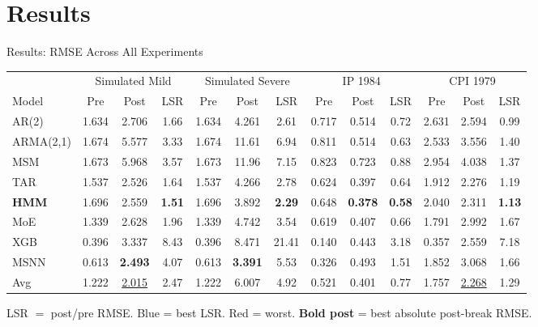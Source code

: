 \documentclass[aspectratio=169, 10pt]{beamer}
\begin{document}
\section{Results}

\begin{frame}{Results: RMSE Across All Experiments}

  \begin{center}\small
  \begin{tabular}{lcccccccccccc}
    \toprule
    & \multicolumn{3}{c}{Simulated Mild} & \multicolumn{3}{c}{Simulated Severe} & \multicolumn{3}{c}{IP 1984} & \multicolumn{3}{c}{CPI 1979} \\
    \cmidrule(lr){2-4}\cmidrule(lr){5-7}\cmidrule(lr){8-10}\cmidrule(lr){11-13}
    Model & Pre & Post & LSR & Pre & Post & LSR & Pre & Post & LSR & Pre & Post & LSR \\
    \midrule
    AR(2)      & 1.634 & 2.706 & 1.66 & 1.634 & 4.261 & 2.61 & 0.717 & 0.514 & 0.72 & 2.631 & 2.594 & 0.99 \\
    ARMA(2,1)  & 1.674 & 5.577 & 3.33 & 1.674 & 11.61 & 6.94 & 0.811 & 0.514 & 0.63 & 2.533 & 3.556 & 1.40 \\
    MSM        & 1.673 & 5.968 & 3.57 & 1.673 & 11.96 & 7.15 & 0.823 & 0.723 & 0.88 & 2.954 & 4.038 & 1.37 \\
    TAR        & 1.537 & 2.526 & 1.64 & 1.537 & 4.266 & 2.78 & 0.624 & 0.397 & 0.64 & 1.912 & 2.276 & 1.19 \\
    \rowcolor{cambblue!40}
    \textbf{HMM} & 1.696 & 2.559 & \textbf{1.51} & 1.696 & 3.892 & \textbf{2.29} & 0.648 & \textbf{0.378} & \textbf{0.58} & 2.040 & 2.311 & \textbf{1.13} \\
    MoE        & 1.339 & 2.628 & 1.96 & 1.339 & 4.742 & 3.54 & 0.619 & 0.407 & 0.66 & 1.791 & 2.992 & 1.67 \\
    \rowcolor{red!20}
    XGB        & 0.396 & 3.337 & 8.43 & 0.396 & 8.471 & 21.41 & 0.140 & 0.443 & 3.18 & 0.357 & 2.559 & 7.18 \\
    MSNN       & 0.613 & \textbf{2.493} & 4.07 & 0.613 & \textbf{3.391} & 5.53 & 0.326 & 0.493 & 1.51 & 1.852 & 3.068 & 1.66 \\
    \rowcolor{cambblue!20}
    Avg        & 1.222 & \underline{2.015} & 2.47 & 1.222 & 6.007 & 4.92 & 0.521 & 0.401 & 0.77 & 1.757 & \underline{2.268} & 1.29 \\
    \bottomrule
  \end{tabular}
  \end{center}

  \vspace{2pt}
  {\footnotesize LSR $=$ post/pre RMSE. \colorbox{cambblue!40}{Blue} = best LSR. \colorbox{red!20}{Red} = worst. \textbf{Bold post} = best absolute post-break RMSE.}

\end{frame}
\end{document}
